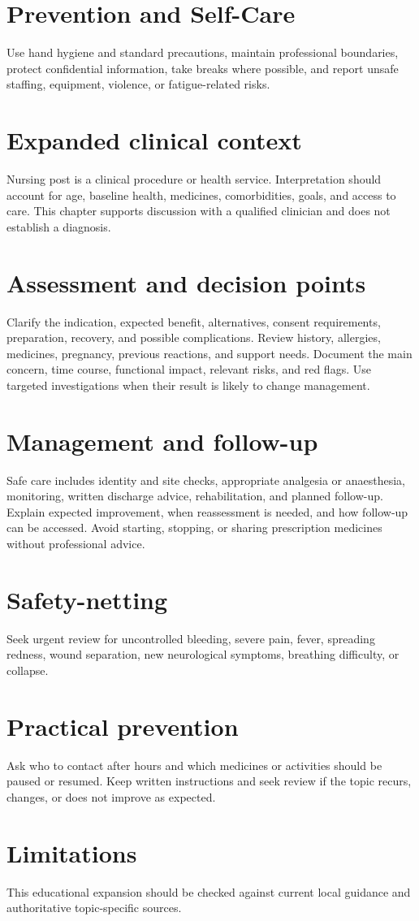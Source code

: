 \section*{Prevention and Self-Care}
Use hand hygiene and standard precautions, maintain professional boundaries, protect confidential information, take breaks where possible, and report unsafe staffing, equipment, violence, or fatigue-related risks.

\section*{Expanded clinical context}
Nursing post is a clinical procedure or health service. Interpretation should account for age, baseline health, medicines, comorbidities, goals, and access to care. This chapter supports discussion with a qualified clinician and does not establish a diagnosis.

\section*{Assessment and decision points}
Clarify the indication, expected benefit, alternatives, consent requirements, preparation, recovery, and possible complications. Review history, allergies, medicines, pregnancy, previous reactions, and support needs. Document the main concern, time course, functional impact, relevant risks, and red flags. Use targeted investigations when their result is likely to change management.

\section*{Management and follow-up}
Safe care includes identity and site checks, appropriate analgesia or anaesthesia, monitoring, written discharge advice, rehabilitation, and planned follow-up. Explain expected improvement, when reassessment is needed, and how follow-up can be accessed. Avoid starting, stopping, or sharing prescription medicines without professional advice.

\section*{Safety-netting}
Seek urgent review for uncontrolled bleeding, severe pain, fever, spreading redness, wound separation, new neurological symptoms, breathing difficulty, or collapse.

\section*{Practical prevention}
Ask who to contact after hours and which medicines or activities should be paused or resumed. Keep written instructions and seek review if the topic recurs, changes, or does not improve as expected.

\section*{Limitations}
This educational expansion should be checked against current local guidance and authoritative topic-specific sources.
\clearpage
